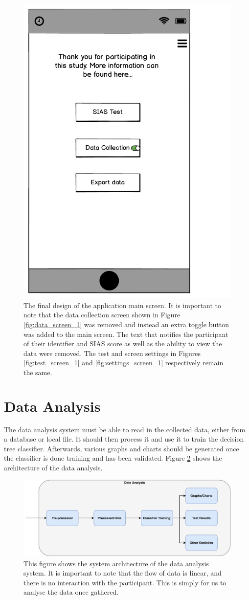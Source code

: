 \documentclass{l4proj}
\begin{document}
\begin{figure}[htbp]
    \centering
    \includegraphics[width=0.40\linewidth]{images/iteration_2_main_screen.pdf}    
    \caption{The final design of the application main screen. It is important to note that the data collection screen shown in Figure \ref{fig:data_screen_1} was removed and instead an extra toggle button was added to the main screen. The text that notifies the participant of their identifier and SIAS score as well as the ability to view the data were removed. The test and screen settings in Figures \ref{fig:test_screen_1} and \ref{fig:settings_screen_1} respectively remain the same.}
    \label{fig:final_prototype_screen} 
\end{figure}


\section{Data Analysis}
The data analysis system must be able to read in the collected data, either from a database or local file. It should then process it and use it to train the decision tree classifier. Afterwards, various graphs and charts should be generated once the classifier is done training and has been validated. Figure \ref{fig:data_analysis_system} shows the architecture of the data analysis.

\begin{figure}[htbp]
    \centering
    \includegraphics[width=0.80\linewidth]{images/data_analysis_system.pdf}    
    \caption{This figure shows the system architecture of the data analysis system. It is important to note that the flow of data is linear, and there is no interaction with the participant. This is simply for us to analyse the data once gathered.}
    \label{fig:data_analysis_system} 
\end{figure}
\end{document}
